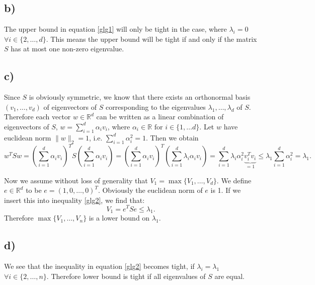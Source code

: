 \documentclass[paper=a4,fontsize=10pt,DIV11,BCOR10mm]{scrartcl}
\begin{document}
\subsection*{b)}

The upper bound in equation \ref{glg1} will only be tight in the case, where $\lambda_i=0$ $\forall i \in \{2,\dots,d\}$. This means the upper bound will be tight if and only if the matrix $S$ has at most one non-zero eigenvalue.


\subsection*{c)}

Since $S$ is obviously symmetric, we know that there exists an orthonormal basis $(v_1,\dots,v_d)$ of eigenvectors of $S$ corresponding to the eigenvalues $\lambda_1,\dots,\lambda_d$ of $S$. Therefore each vector $w\in \mathbb{R}^d$ can be written as a linear combination of eigenvectors of $S$, $w=\sum_{i=1}^d \alpha_iv_i$, where $\alpha_i \in \mathbb{R} \text{ for } i \in \{1,\dots d\}$.
Let $w$ have euclidean norm $\lVert w \rVert_2=1$, i.e. $\sum_{i=1}^d \alpha_i^2=1$. Then we obtain
\begin{equation}\label{glg2}
w^TSw=(\sum_{i=1}^d \alpha_iv_i)^TS(\sum_{i=1}^d \alpha_iv_i)=(\sum_{i=1}^d \alpha_iv_i)^T(\sum_{i=1}^d \lambda_i \alpha_i v_i)
=\sum_{i=1}^d \lambda_i\alpha_i^2 \underbrace{v_i^Tv_i}_{=1} \leq \lambda_1 \sum_{i=1}^d\alpha_i^2=\lambda_1\text{.}
\end{equation} 

Now we assume without loss of generality that $V_1=\max\{V_1,\dots,V_d\}$. We define $e\in \mathbb{R}^d$ to be $e=(1,0,\dots,0)^T$. Obviously the euclidean norm of $e$ is 1. If we insert this into inequality \ref{glg2}, we find that:
\begin{equation*}
V_1=e^TSe \leq \lambda_1\text{.}
\end{equation*}
Therefore $\max\{V_1,\dots,V_n\}$ is a lower bound on $\lambda_1$.


\subsection*{d)}
 We see that the inequality in equation \ref{glg2} becomes tight, if $\lambda_i=\lambda_1$ $\forall i \in \{2,\dots ,n\}$. Therefore lower bound is tight if all eigenvalues of $S$ are equal.



\end{document}
